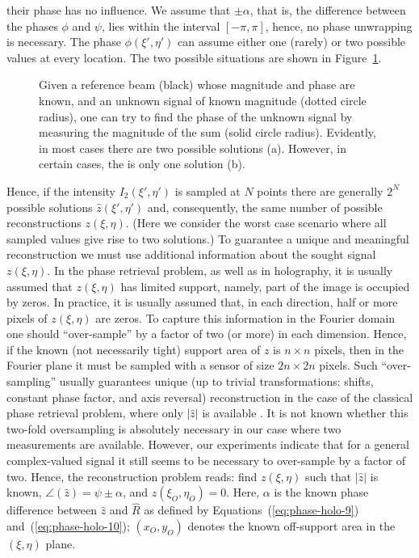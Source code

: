 their phase has no influence. We assume that $\pm\alpha$, that is,
the difference between the phases $\phi$ and $\psi$, lies within
the interval $[-\pi,\pi]$, hence, no phase unwrapping is
necessary. The phase $\phi(\xi',\eta')$ can assume either one
(rarely) or two possible values at every location. The two
possible situations are shown in
Figure~\ref{fig:holography-possible-situations}.
\begin{figure}[H]
  \centering
  \qquad{}
  \caption[Possible scenarios in Fourier domain holography]{Given a reference beam (black) whose magnitude and phase
    are known, and an unknown signal of known magnitude (dotted
    circle radius), one can try to find the phase of the unknown
    signal by measuring the magnitude of the sum (solid circle
    radius). Evidently, in most cases there are two possible
    solutions (a). However, in certain cases, the is only one
    solution (b).}
  \label{fig:holography-possible-situations}
\end{figure}


Hence, if the
intensity $I_{2}(\xi',\eta')$ is sampled at $N$ points there are
generally $2^{N}$ possible solutions $\hat{z}(\xi',\eta')$ and,
consequently, the same number of possible reconstructions
$z(\xi,\eta)$. (Here we consider the worst case scenario where all
sampled values give rise to two solutions.) To guarantee a unique
and meaningful reconstruction we must use additional information
about the sought signal $z(\xi,\eta)$. In the phase retrieval problem,
as well as in holography, 
it is usually assumed that $z(\xi,\eta)$ has limited support, namely,
part of the image is occupied by zeros.  In practice, it is
usually assumed that, in each direction, half or more pixels of
$z(\xi,\eta)$ are zeros. To capture this information in the Fourier
domain one should ``over-sample'' by a factor of two (or more) in
each dimension. Hence, if the known (not necessarily tight)
support area of $z$ is $n\times n$ pixels, then in the Fourier
plane it must be sampled with a sensor of size $2n\times 2n$
pixels. Such ``over-sampling'' usually guarantees unique (up to
trivial transformations: shifts, constant phase factor, and axis
reversal) reconstruction in the case of the classical phase
retrieval problem, where only $|\hat{z}|$ is available
. It is not known whether this
two-fold oversampling is absolutely necessary in our case where
two measurements are available. However, our experiments indicate
that for a general complex-valued signal it still seems to be
necessary to over-sample by a factor of two. Hence, the
reconstruction problem reads: find $z(\xi,\eta)$ such that $|\hat{z}|$
is known, $\angle(\hat{z})=\psi\pm\alpha$, and $z(\xi_{O},\eta_{O}) =
0$. Here, $\alpha$ is the known phase difference between $\hat{z}$
and $\hat{R}$ as defined by Equations~(\ref{eq:phase-holo-9})
and~(\ref{eq:phase-holo-10}); $(x_{O},y_{O})$ denotes the known off-support
area in the $(\xi,\eta)$ plane.

